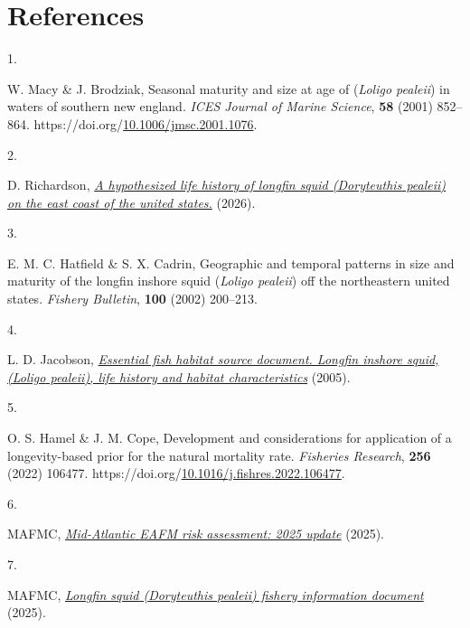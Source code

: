 \documentclass[
  9pt,
  letterpaper,
  DIV=11,
  numbers=noendperiod]{scrartcl}
\newlength{\cslhangindent}
\newlength{\csllabelwidth}
\newenvironment{CSLReferences}[2] %
 {\begin{list}{}{%
  \setlength{\itemindent}{0pt}
  \setlength{\leftmargin}{0pt}
  \setlength{\parsep}{0pt}
  \ifodd #1
   \setlength{\leftmargin}{\cslhangindent}
   \setlength{\itemindent}{-1\cslhangindent}
  \fi
  \setlength{\itemsep}{#2\baselineskip}}}
 {\end{list}}
\newcommand{\CSLLeftMargin}[1]{\parbox[t]{\csllabelwidth}{\strut#1\strut}}
\newcommand{\CSLRightInline}[1]{\parbox[t]{\linewidth - \csllabelwidth}{\strut#1\strut}}
\begin{document}
\section{References}\label{references}

\label{refs}
\begin{CSLReferences}{0}{0}
\CSLLeftMargin{1. }%
\CSLRightInline{W. Macy \& J. Brodziak, Seasonal maturity and size at
age of (\emph{{Loligo} pealeii}) in waters of southern new england.
\emph{ICES Journal of Marine Science}, \textbf{58} (2001) 852--864.
https://doi.org/\href{https://doi.org/10.1006/jmsc.2001.1076}{10.1006/jmsc.2001.1076}.}

\CSLLeftMargin{2. }%
\CSLRightInline{D. Richardson, \emph{\href{}{A hypothesized life history
of longfin squid (\emph{{Doryteuthis} pealeii}) on the east coast of the
united states.}} (2026).}

\CSLLeftMargin{3. }%
\CSLRightInline{E. M. C. Hatfield \& S. X. Cadrin, Geographic and
temporal patterns in size and maturity of the longfin inshore squid
(\emph{{Loligo} pealeii}) off the northeastern united states.
\emph{Fishery Bulletin}, \textbf{100} (2002) 200--213.}

\CSLLeftMargin{4. }%
\CSLRightInline{L. D. Jacobson,
\emph{\href{https://repository.library.noaa.gov/view/noaa/4035}{Essential
fish habitat source document. Longfin inshore squid, (\emph{{Loligo}
pealeii}), life history and habitat characteristics}} (2005).}

\CSLLeftMargin{5. }%
\CSLRightInline{O. S. Hamel \& J. M. Cope, Development and
considerations for application of a longevity-based prior for the
natural mortality rate. \emph{Fisheries Research}, \textbf{256} (2022)
106477.
https://doi.org/\href{https://doi.org/10.1016/j.fishres.2022.106477}{10.1016/j.fishres.2022.106477}.}

\CSLLeftMargin{6. }%
\CSLRightInline{MAFMC,
\emph{\href{https://static1.squarespace.com/static/511cdc7fe4b00307a2628ac6/t/67d45b1680e8654ecaf1b98e/1741970199497/b_Draft+MAB_RiskAssess_2025.pdf}{Mid-{Atlantic}
{EAFM} risk assessment: 2025 update}} (2025).}

\CSLLeftMargin{7. }%
\CSLRightInline{MAFMC,
\emph{\href{https://static1.squarespace.com/static/511cdc7fe4b00307a2628ac6/t/6806b0eab3a3986a9561ef3c/1745268972731/Longfin-FID_2025-04.pdf}{Longfin
squid (\emph{{Doryteuthis} pealeii}) fishery information document}}
(2025).}


\end{CSLReferences}
\end{document}
